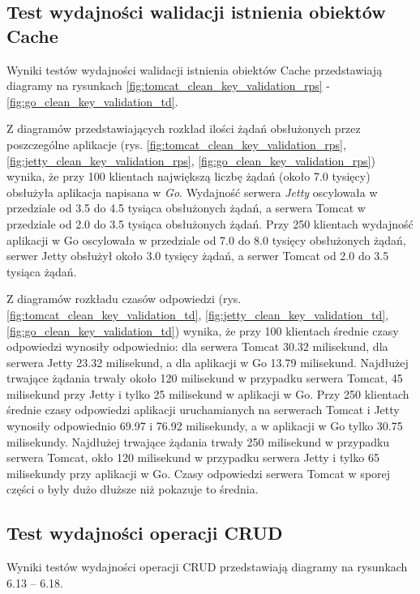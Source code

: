 % 
\clearpage

\subsection{Test wydajności walidacji istnienia obiektów Cache}
Wyniki testów wydajności walidacji istnienia obiektów Cache przedstawiają diagramy na rysunkach \ref{fig:tomcat_clean_key_validation_rps} - \ref{fig:go_clean_key_validation_td}.              

Z diagramów przedstawiających rozkład ilości żądań obsłużonych przez poszczególne aplikacje  (rys. \ref{fig:tomcat_clean_key_validation_rps}, \ref{fig:jetty_clean_key_validation_rps}, \ref{fig:go_clean_key_validation_rps}) wynika, że przy 100 klientach największą liczbę żądań (około 7.0 tysięcy) obsłużyła aplikacja napisana w \textsl{Go}. Wydajność serwera \textsl{Jetty} oscylowała w przedziale od 3.5 do 4.5 tysiąca obsłużonych żądań, a serwera Tomcat w przedziale od 2.0 do 3.5 tysiąca obsłużonych żądań. Przy 250 klientach wydajność aplikacji w Go oscylowała w przedziale od 7.0 do 8.0 tysięcy obsłużonych żądań, serwer Jetty obsłużył około 3.0 tysięcy żądań, a serwer Tomcat od 2.0 do 3.5 tysiąca żądań.

Z diagramów rozkładu czasów odpowiedzi (rys. \ref{fig:tomcat_clean_key_validation_td}, \ref{fig:jetty_clean_key_validation_td}, \ref{fig:go_clean_key_validation_td}) wynika, że przy 100 klientach średnie czasy odpowiedzi wynosiły odpowiednio: dla serwera Tomcat 30.32 milisekund, dla serwera Jetty 23.32 milisekund, a dla aplikacji w Go 13.79 milisekund. Najdłużej trwające żądania trwały około 120 milisekund w przypadku serwera Tomcat, 45 milisekund przy Jetty i tylko 25 milisekund w aplikacji w Go. Przy 250 klientach średnie czasy odpowiedzi aplikacji uruchamianych na serwerach Tomcat i Jetty wynosiły odpowiednio 69.97 i 76.92 milisekundy, a w aplikacji w Go tylko 30.75 milisekundy. Najdłużej trwające żądania trwały 250 milisekund w przypadku serwera Tomcat, okło 120 milisekund w przypadku serwera Jetty i tylko 65 milisekundy przy aplikacji w Go. Czasy odpowiedzi serwera Tomcat w sporej części o były dużo dłuższe niż pokazuje to średnia.


\clearpage

\subsection{Test wydajności operacji CRUD}
Wyniki testów wydajności operacji CRUD przedstawiają diagramy na rysunkach 6.13 – 6.18.

